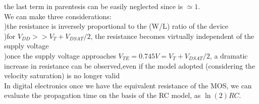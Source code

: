 the last term in parentesis can be easily neglected since is $\simeq 1$.\\
We can make three considerations:\\
)the resistance is inversely proportional to the (W/L) ratio of the device\\
)for $V_{DD} >> V_T + V_{DSAT}/2$, the resistance becomes virtually independent of the supply voltage\\
)once the supply voltage approaches $V_{TE} =0.745V=V_T+V_{DSAT}/2$, a dramatic increase in resistance can be observed,even if the model adopted (considering the velocity saturation) is no longer valid\\
\vspace{5mm}
In digital electronics once we have the equivalent resistance of the MOS, we can evaluate the propagation time on the basis of the RC model, as $\ln(2)RC$.\\














